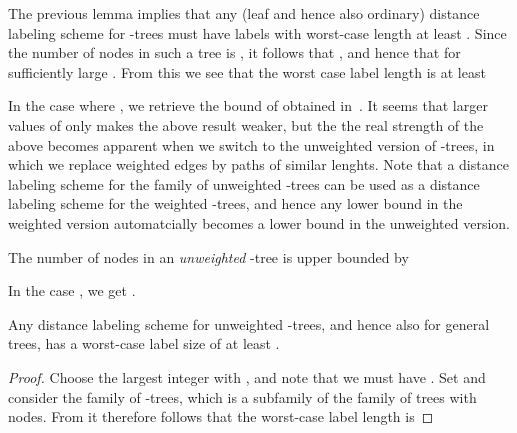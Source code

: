The previous lemma implies that any (leaf and hence also ordinary) distance labeling scheme for -trees must have labels with worst-case length at least . Since the number of nodes in such a tree is , it follows that , and hence that  for sufficiently large . From this we see that the worst case label length is at least 

In the case where , we retrieve the bound of  obtained in~\cite{gavoillepelegperennesraz}. It seems that larger values of  only makes the above result weaker, but the the real strength of the above becomes apparent when we switch to the unweighted version of -trees, in which we replace weighted edges by paths of similar lenghts. Note that a distance labeling scheme for the family of unweighted -trees can be used as a distance labeling scheme for the weighted -trees, and hence any lower bound in the weighted version automatcially becomes a lower bound in the unweighted version.

The number of nodes  in an \emph{unweighted} -tree is upper bounded by

In the case , we get .

\begin{theorem} \label{theo:distancelowerbintrees}
Any distance labeling scheme for unweighted -trees, and hence also for general trees, has a worst-case label size of at least .
\end{theorem}
\begin{proof}
Choose the largest integer  with , and note that we must have .  Set  and consider the family of  -trees, which is a subfamily of the family of trees with  nodes. From  it therefore follows that the worst-case label length is

\end{proof}

